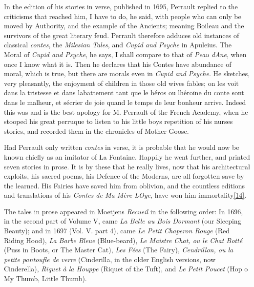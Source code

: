 \documentclass[14pt,a4paper]{memoir}
\begin{document}
In the edition of his stories in verse, published in 1695, Perrault
replied to the criticisms that reached him, \textquotesingle I have to
do,\textquotesingle{} he said, \textquotesingle with people who can only
be moved by Authority, and the example of the
Ancients;\textquotesingle{} meaning Boileau and the survivors of the
great literary feud. Perrault therefore adduces old instances of
classical \emph{contes}, the \emph{Milesian Tales}, and \emph{Cupid and
Psyche} in Apuleius. \textquotesingle The Moral of \emph{Cupid and
Psyche},\textquotesingle{} he says, \textquotesingle I shall compare to
that of \emph{Peau d\textquotesingle Ane}, when once I know what it
is.\textquotesingle{} Then he declares that his Contes have abundance of
moral, which is true, but there are morals even in \emph{Cupid and
Psyche}. He sketches, very pleasantly, the enjoyment of children in
those old wives\textquotesingle{} fables; \textquotesingle on les voit
dans la tristesse et dans l\textquotesingle abattement tant que le héros
ou l\textquotesingle héroïne du conte sont dans le malheur, et
s\textquotesingle écrier de joie quand le temps de leur bonheur
arrive.\textquotesingle{} Indeed this was and is the best apology for M.
Perrault of the French Academy, when he stooped his great perruque to
listen to his little boy\textquotesingle s repetition of his
nurse\textquotesingle s stories, and recorded them in the chronicles of
Mother Goose.

Had Perrault only written \emph{contes} in verse, it is probable that he
would now be known chiefly as an imitator of La Fontaine. Happily he
went further, and printed seven stories in prose. It is by these that he
really lives, now that his architectural exploits, his sacred poems, his
Defence of the Moderns, are all forgotten save by the learned. His
Fairies have saved him from oblivion, and the countless editions and
translations of his \emph{Contes de Ma Mère L\textquotesingle Oye}, have
won him
immortality\protect\hypertarget{4533318093929944247_33931-h-0.htm.xhtmlux5cux23FNanchor_14}{}{}\protect\hyperlink{4533318093929944247_33931-h-0.htm.xhtmlux5cux23Footnote_14}{{[}14{]}}.

The tales in prose appeared in Moetjens\textquotesingle{} \emph{Recueil}
in the following order: In 1696, in the second part of Volume V, came
\emph{La Belle au Bois Dormant} (our \textquotesingle Sleeping
Beauty\textquotesingle); and in 1697 (Vol. V. part 4), came \emph{Le
Petit Chaperon Rouge} (\textquotesingle Red Riding
Hood\textquotesingle), \emph{La Barbe Bleue}
(\textquotesingle Blue-beard\textquotesingle), \emph{Le Maistre Chat, ou
le Chat Botté} (\textquotesingle Puss in Boots,\textquotesingle{} or
\textquotesingle The Master Cat\textquotesingle), \emph{Les Fées}
(\textquotesingle The Fairy\textquotesingle), \emph{Cendrillon, ou la
petite pantoufle de verre}
(\textquotesingle Cinderilla,\textquotesingle{} in the older English
versions, now \textquotesingle Cinderella\textquotesingle), \emph{Riquet
à la Houppe} (\textquotesingle Riquet of the Tuft\textquotesingle), and
\emph{Le Petit Poucet} (\textquotesingle Hop o\textquotesingle{} My
Thumb, Little Thumb\textquotesingle).
\end{document}
